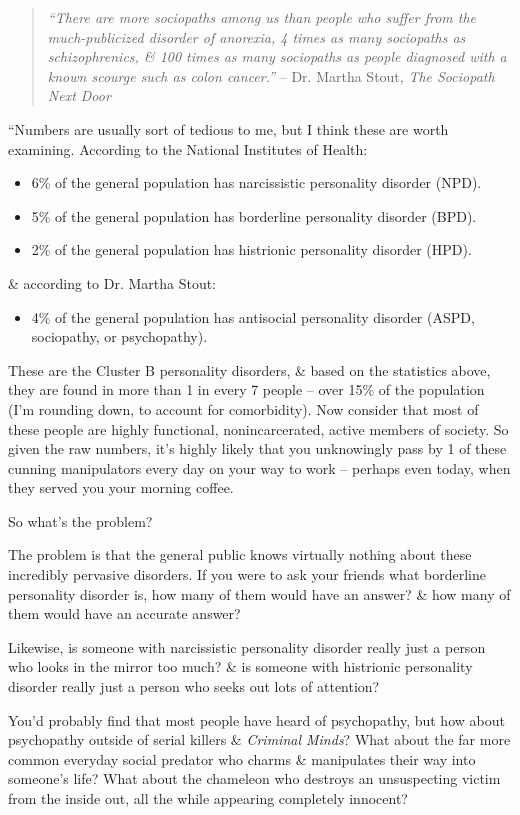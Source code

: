 \documentclass{article}
\numberwithin{equation}{section}
\begin{document}
\begin{quotation}
	\textit{``There are more sociopaths among us than people who suffer from the much-publicized disorder of anorexia, 4 times as many sociopaths as schizophrenics, \& 100 times as many sociopaths as people diagnosed with a known scourge such as colon cancer.''} -- Dr. Martha Stout, \textit{The Sociopath Next Door}
\end{quotation}
``Numbers are usually sort of tedious to me, but I think these are worth examining. According to the National Institutes of Health:
\begin{itemize}
	\item 6\% of the general population has narcissistic personality disorder (NPD).
	\item 5\% of the general population has borderline personality disorder (BPD).
	\item 2\% of the general population has histrionic personality disorder (HPD).
\end{itemize}
\& according to Dr. Martha Stout:
\begin{itemize}
	\item 4\% of the general population has antisocial personality disorder (ASPD, sociopathy, or psychopathy).
\end{itemize}
These are the Cluster B personality disorders, \& based on the statistics above, they are found in more than 1 in every 7 people -- over 15\% of the population (I'm rounding down, to account for comorbidity). Now consider that most of these people are highly functional, nonincarcerated, active members of society. So given the raw numbers, it's highly likely that you unknowingly pass by 1 of these cunning manipulators every day on your way to work -- perhaps even today, when they served you your morning coffee.

So what's the problem?

The problem is that the general public knows virtually nothing about these incredibly pervasive disorders. If you were to ask your friends what borderline personality disorder is, how many of them would have an answer? \& how many of them would have an accurate answer?

Likewise, is someone with narcissistic personality disorder really just a person who looks in the mirror too much? \& is someone with histrionic personality disorder really just a person who seeks out lots of attention?

You'd probably find that most people have heard of psychopathy, but how about psychopathy outside of serial killers \& \textit{Criminal Minds}? What about the far more common everyday social predator who charms \& manipulates their way into someone's life? What about the chameleon who destroys an unsuspecting victim from the inside out, all the while appearing completely innocent?
\end{document}
